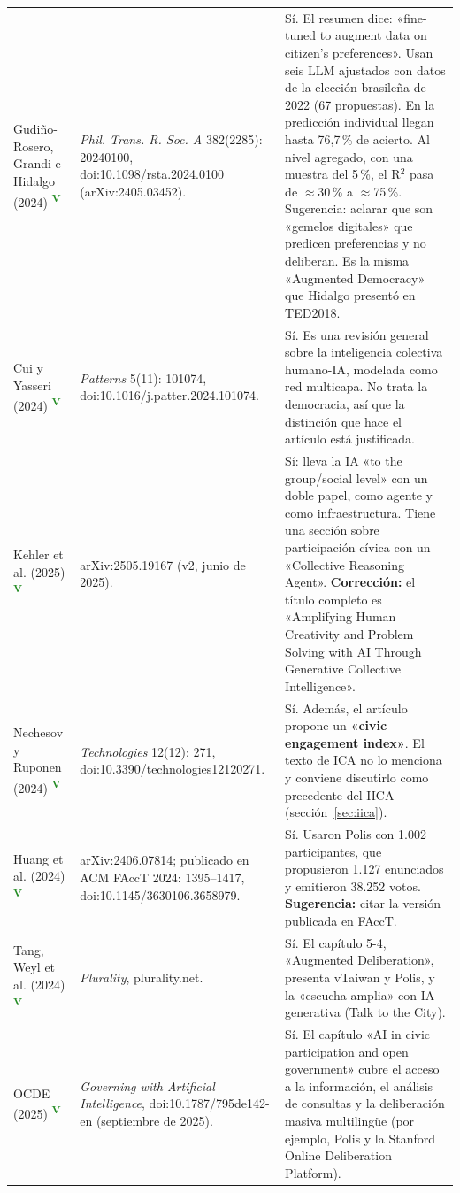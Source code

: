 \documentclass[11pt,a4paper]{article}
\newcommand{\ver}{\textsuperscript{\textcolor{ForestGreen}{\textbf{V}}}}
\begin{document}
{\begin{longtable}{P{3.0cm}P{5.4cm}P{5.8cm}}
Gudiño-Rosero, Grandi e Hidalgo (2024) \ver &
\emph{Phil. Trans. R. Soc. A} 382(2285): 20240100, doi:10.1098/rsta.2024.0100 (arXiv:2405.03452). &
Sí. El resumen dice: «fine-tuned to augment data on citizen's preferences». Usan seis LLM ajustados con datos de la elección brasileña de 2022 (67 propuestas). En la predicción individual llegan hasta 76,7\,\% de acierto. Al nivel agregado, con una muestra del 5\,\%, el R$^2$ pasa de $\approx$30\,\% a $\approx$75\,\%. Sugerencia: aclarar que son «gemelos digitales» que predicen preferencias y no deliberan. Es la misma «Augmented Democracy» que Hidalgo presentó en TED2018.\\
Cui y Yasseri (2024) \ver &
\emph{Patterns} 5(11): 101074, doi:10.1016/j.patter.2024.101074. &
Sí. Es una revisión general sobre la inteligencia colectiva humano-IA, modelada como red multicapa. No trata la democracia, así que la distinción que hace el artículo está justificada.\\
Kehler et al. (2025) \ver &
arXiv:2505.19167 (v2, junio de 2025). &
Sí: lleva la IA «to the group/social level» con un doble papel, como agente y como infraestructura. Tiene una sección sobre participación cívica con un «Collective Reasoning Agent». \textbf{Corrección:} el título completo es «Amplifying Human Creativity and Problem Solving with AI Through Generative Collective Intelligence».\\
Nechesov y Ruponen (2024) \ver &
\emph{Technologies} 12(12): 271, doi:10.3390/technologies12120271. &
Sí. Además, el artículo propone un \textbf{«civic engagement index»}. El texto de ICA no lo menciona y conviene discutirlo como precedente del IICA (sección~\ref{sec:iica}).\\
Huang et al. (2024) \ver &
arXiv:2406.07814; publicado en ACM FAccT 2024: 1395--1417, doi:10.1145/3630106.3658979. &
Sí. Usaron Polis con 1.002 participantes, que propusieron 1.127 enunciados y emitieron 38.252 votos. \textbf{Sugerencia:} citar la versión publicada en FAccT.\\
Tang, Weyl et al. (2024) \ver &
\emph{Plurality}, plurality.net. &
Sí. El capítulo 5-4, «Augmented Deliberation», presenta vTaiwan y Polis, y la «escucha amplia» con IA generativa (Talk to the City).\\
OCDE (2025) \ver &
\emph{Governing with Artificial Intelligence}, doi:10.1787/795de142-en (septiembre de 2025). &
Sí. El capítulo «AI in civic participation and open government» cubre el acceso a la información, el análisis de consultas y la deliberación masiva multilingüe (por ejemplo, Polis y la Stanford Online Deliberation Platform).\\

\end{longtable}}
\end{document}

